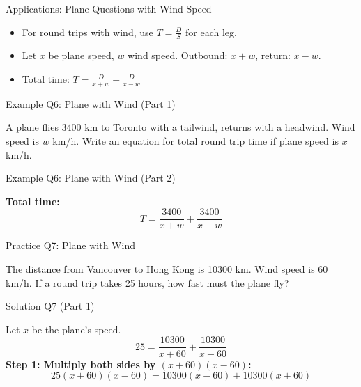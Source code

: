 \documentclass[aspectratio=169]{beamer}
\begin{document}
\begin{frame}{Applications: Plane Questions with Wind Speed}
\begin{tcolorbox}[colback=lightgray,colframe=primary,title=Key Concepts]
\footnotesize
\begin{itemize}
  \item For round trips with wind, use $T = \frac{D}{S}$ for each leg.
  \item Let $x$ be plane speed, $w$ wind speed. Outbound: $x+w$, return: $x-w$.
  \item Total time: $T = \frac{D}{x+w} + \frac{D}{x-w}$
\end{itemize}
\end{tcolorbox}
\end{frame}

\begin{frame}{Example Q6: Plane with Wind (Part 1)}
\begin{tcolorbox}[colback=lightgray,colframe=secondary,title=Example Q6 (Part 1)]
\footnotesize
A plane flies 3400 km to Toronto with a tailwind, returns with a headwind. Wind speed is $w$ km/h. Write an equation for total round trip time if plane speed is $x$ km/h.
\end{tcolorbox}
\end{frame}

\begin{frame}{Example Q6: Plane with Wind (Part 2)}
\begin{tcolorbox}[colback=lightgray,colframe=secondary,title=Example Q6 (Part 2)]
\footnotesize
\textbf{Total time:}
\[
T = \frac{3400}{x+w} + \frac{3400}{x-w}
\]
\end{tcolorbox}
\end{frame}

\begin{frame}{Practice Q7: Plane with Wind}
\begin{tcolorbox}[colback=lightgray,colframe=primary,title=Practice Q7]
\footnotesize
The distance from Vancouver to Hong Kong is 10300 km. Wind speed is 60 km/h. If a round trip takes 25 hours, how fast must the plane fly?
\end{tcolorbox}
\end{frame}

\begin{frame}{Solution Q7 (Part 1)}
\begin{tcolorbox}[colback=lightgray,colframe=accent,title=Solution Q7 (Part 1)]
\footnotesize
Let $x$ be the plane's speed.
\[
25 = \frac{10300}{x+60} + \frac{10300}{x-60}
\]
\textbf{Step 1: Multiply both sides by $(x+60)(x-60)$:}
\[
25(x+60)(x-60) = 10300(x-60) + 10300(x+60)
\]
\end{tcolorbox}
\end{frame}
\end{document}
